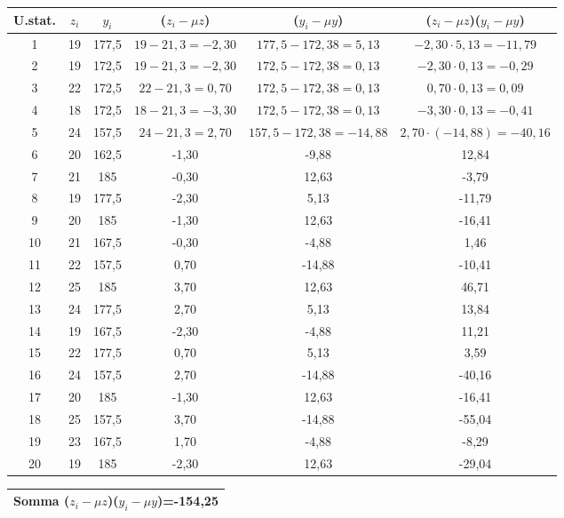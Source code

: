 \begin{esempio}
{\footnotesize
    \begin{adjustwidth}{-.5in}{-.5in}
\begin{center}
\vspace{6pt}
\noindent
\begin{tabular}{|c|c|c|c|c|c|}
\hline
U.stat. &      \(z_i\)&  \(y_i\)&  (\(z_i-\mu z\)) & 
(\(y_i-\mu y\))&(\(z_i-\mu z\))(\(y_i-\mu y\))\\\hline
1&      19&     177,5&  \(19-21,3=-2,30\) &       \(177,5-172,38=5,13\)&
\(-2,30 \cdot 5,13=-11,79\)\\\hline
2&      19&     172,5&  \(19-21,3=-2,30\)&     \(172,5-172,38=0,13\)&
\(-2,30 \cdot 0,13=-0,29\)\\\hline
3&      22&     172,5&  \(22-21,3=0,70\)&      \(172,5-172,38=0,13\)&   
\(0,70 \cdot 0,13=0,09\)\\\hline
4&      18&     172,5&  \(18-21,3=-3,30\)&     \(172,5-172,38=0,13\)&   
\(-3,30 \cdot 0,13=-0,41\)\\\hline
5&      24&     157,5&  \(24-21,3=2,70\)&      \(157,5-172,38=-14,88\)& 
\(2,70 \cdot (-14,88)=-40,16\)\\\hline
6&      20&     162,5&  -1,30&  -9,88&  12,84\\\hline
7&      21&     185&    -0,30&  12,63&  -3,79\\\hline
8&      19&     177,5&  -2,30&  5,13&   -11,79\\\hline
9&      20      &185&   -1,30&  12,63&  -16,41\\\hline
10&     21&     167,5&  -0,30&  -4,88&  1,46\\\hline
11&     22&     157,5&  0,70&   -14,88& -10,41\\\hline
12&     25&     185&    3,70&   12,63&  46,71\\\hline
13&     24&     177,5&  2,70&   5,13&   13,84\\\hline
14&     19&     167,5&  -2,30&  -4,88&  11,21\\\hline
15&     22&     177,5&  0,70&   5,13&   3,59\\\hline
16&     24&     157,5&  2,70&   -14,88& -40,16\\\hline
17&     20&     185&    -1,30&  12,63&  -16,41\\\hline
18&     25&     157,5   &3,70&  -14,88& -55,04\\\hline
19&     23&     167,5   &1,70&  -4,88&  -8,29\\\hline
20&     19      &185&   -2,30&  12,63&  -29,04\\\hline
\end{tabular}
\end{center}
    \end{adjustwidth}
}
\begin{center}
\vspace{6pt}
\begin{tabular}{|c|}
\hline
Somma (\(z_i-\mu z\))(\(y_i-\mu y\))=-154,25\\
\hline
\end{tabular}
\end{center}


\end{esempio}
